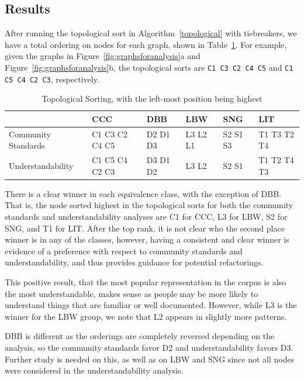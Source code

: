 \subsection{Results}
After running the topological sort in Algorithm~\ref{topological} with tiebreakers, we have a total ordering on nodes for each graph, shown in Table~\ref{topologicalResults}.  For example, given the graphs in Figure~\ref{fig:graphsforanalysis}a and Figure~\ref{fig:graphsforanalysis}b, the topological sorts are {\tt C1 C3 C2 C4 C5} and {\tt C1 C5 C4 C2 C3}, respectively.

\begin{table}
\centering
\caption{Topological Sorting, with the left-most position being highest \label{topologicalResults}}
\begin{tabular}{|| l || l || l || l || l || l ||}
				& CCC			& DBB 		& LBW & SNG & LIT \\ \hline
Community Standards		& C1 C3 C2 C4 C5 	& D2 D1 D3	&  L3 L2 L1 	& S2 S1 S3 	& T1 T3 T2 T4 \\
Understandability 			& C1 C5 C4 C2 C3 	& D3 D1 D2 	& L3 L2		& S2 S1		& T1 T2 T4 T3 \\
\end{tabular}
\end{table}




There is a clear winner in each equivalence class, with the exception of DBB.
That is, the node sorted highest in the topological sorts for both the community standards and understandability analyses are C1 for CCC, L3 for LBW, S2 for SNG, and T1 for LIT.
After the top rank, it is not clear who the second place winner is in any of the classes, however, having a consistent and clear winner is evidence of a preference with respect to community standards and understandability, and thus provides guidance for potential refactorings.

This positive result, that the most popular representation in the corpus is also the most understandable, makes sense as people may be more likely to understand things that are familiar or well documented. However, while L3 is the winner for the LBW group, we note that L2 appears in slightly more patterns.

DBB is different  as the orderings are completely reversed depending on the analysis, so the community standards favor D2 and understandability favors D3. Further study is needed on this, as well as on LBW and SNG since not all nodes were considered in the understandability analysis.


